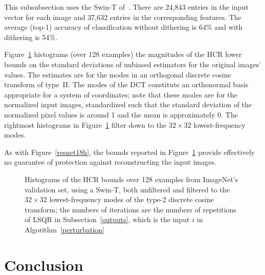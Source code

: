 \documentclass[]{fairmeta}
\begin{document}
This subsubsection uses the Swin-T of~\cite{liu-lin-cao-hu-wei-zhang-lin-guo}.
There are 24,843 entries in the input vector for each image
and 37,632 entries in the corresponding features.
The average (top-1) accuracy of classification without dithering is 64\%
and with dithering is 54\%.

Figure~\ref{swinth} histograms (over 128 examples) the magnitudes
of the HCR lower bounds on the standard deviations of unbiased estimators
for the original images' values. The estimates are for the modes
in an orthogonal discrete cosine transform of type~II.
The modes of the DCT constitute an orthonormal basis appropriate for a system
of coordinates; note that these modes are for the normalized input images,
standardized such that the standard deviation of the normalized pixel values
is around 1 and the mean is approximately 0.
The rightmost histograms in Figure~\ref{swinth}
filter down to the $32 \times 32$ lowest-frequency modes.

As with Figure~\ref{resnet18h}, the bounds reported in Figure~\ref{swinth}
provide effectively no guarantee of protection against reconstructing
the input images.

\begin{figure}
\begin{center}

\end{center}
%
\caption{Histograms of the HCR bounds over 128 examples
from ImageNet's validation set, using a Swin-T,
both unfiltered and filtered to the $32 \times 32$ lowest-frequency modes
of the type-2 discrete cosine transform; the numbers of iterations
are the numbers of repetitions of LSQR in Subsection~\ref{outputs},
which is the input $i$ in Algorithm~\ref{perturbation}}
\label{swinth}
%
\end{figure}



\section{Conclusion}
\label{conclusion}
\end{document}
